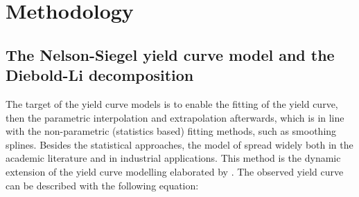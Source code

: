 \documentclass[12pt,bibliography=totoc]{article}
\begin{document}



\section{Methodology}
\noindent
\subsection{The Nelson-Siegel yield curve model and the Diebold-Li decomposition}


The target of the yield curve models is to enable the fitting of the yield curve, then the parametric interpolation and extrapolation afterwards, which is in line with the non-parametric (statistics based) fitting methods, such as smoothing splines.
Besides the statistical approaches, the model of \cite{diebold2006forecasting} spread widely both in the academic literature and in industrial applications. This method is the dynamic extension of the yield curve modelling elaborated by \cite{nelson1987parsimonious}. The observed yield curve can be described with the following equation:
\end{document}
